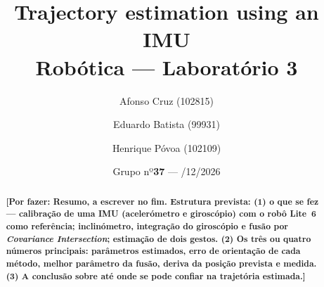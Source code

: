 \documentclass[11pt,a4paper]{article}
\title{{\color{verde}\textbf{Trajectory estimation using an IMU}}\\[2mm]
       {\large\color{azul} Robótica --- Laboratório 3}}
\author{{Afonso Cruz (102815)} \and {Eduardo Batista (99931)} \and {Henrique Póvoa (102109)}}
\date{Grupo {nº\textbf{37}} \quad --- \quad 18/12/2026}
\newcommand{\todo}[1]{\textcolor{mau}{\textbf{[Por fazer: #1]}}}
\begin{document}
\maketitle

\begin{abstract}
\begin{caixaresumo}
\todo{Resumo, a escrever no fim. Estrutura prevista: (1) o que se fez ---
calibração de uma IMU (acelerómetro e giroscópio) com o robô Lite~6 como
referência; inclinómetro, integração do giroscópio e fusão por
\emph{Covariance Intersection}; estimação de dois gestos. (2) Os três ou
quatro números principais: parâmetros estimados, erro de orientação de cada
método, melhor parâmetro da fusão, deriva da posição prevista e medida.
(3) A conclusão sobre até onde se pode confiar na trajetória estimada.}
\end{caixaresumo}
\end{abstract}




\end{document}
